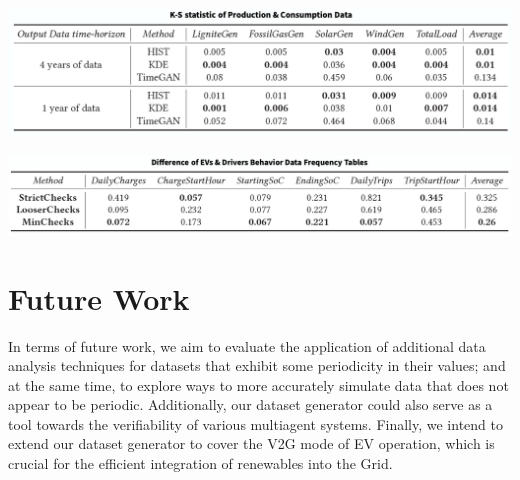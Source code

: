 \documentclass{article}
\begin{document}
\begin{multicols}{3}
\vspace{.5cm}
\noindent         \includegraphics[width=\linewidth]{figures/table1}

\vspace{.5cm}
\noindent         \includegraphics[width=\linewidth]{figures/table}
\section*{Future Work}

In terms of future work, we aim to evaluate the application of
additional data analysis techniques for datasets that exhibit some
periodicity in their values; and at the same time, to explore ways to
more accurately simulate data that does not appear to be periodic.
Additionally, our dataset generator
could also serve as a tool towards the verifiability of various multiagent
systems. Finally,
we intend to extend our dataset generator to cover the V2G mode
of EV operation, which is crucial for the efficient integration of
renewables into the Grid.


\end{multicols}
\end{document}
